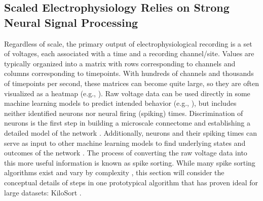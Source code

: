 \documentclass[11pt]{article}
\newcommand{\subsectionwithindent}[1]{
    \subsection*{#1}
    \hspace{\parindent} %
}
\begin{document}
\subsectionwithindent{Scaled Electrophysiology Relies on Strong Neural Signal Processing}
Regardless of scale, the primary output of electrophysiological recording is a set of voltages, each associated with a time and a recording channel/site. Values are typically organized into a matrix with rows corresponding to channels and columns corresponding to timepoints. With hundreds of channels and thousands of timepoints per second, these matrices can become quite large, so they are often visualized as a heatmap (e.g., \cite[Fig.~2A]{pachitariu2016kilosort}). Raw voltage data can be used directly in some machine learning models to predict intended behavior (e.g., \cite{musk2019integrated}), but includes neither identified neurons nor neural firing (spiking) times. Discrimination of neurons is the first step in building a microscale connectome and establishing a detailed model of the network \cite{ciarrusta2023connectome, jog2002tetrode,pachitariu2016kilosort}. Additionally, neurons and their spiking times can serve as input to other machine learning models to find underlying states and outcomes of the network \cite{pandarinath2018autoencoders, keshtkaran2022large}. The process of converting the raw voltage data into this more useful information is known as spike sorting. While many spike sorting algorithms exist and vary by complexity \cite{jog2002tetrode, pachitariu2016kilosort}, this section will consider the conceptual details of steps in one prototypical algorithm that has proven ideal for large datasets: KiloSort \cite{pachitariu2016kilosort, pachitariu2024kilosort4}.
\end{document}
